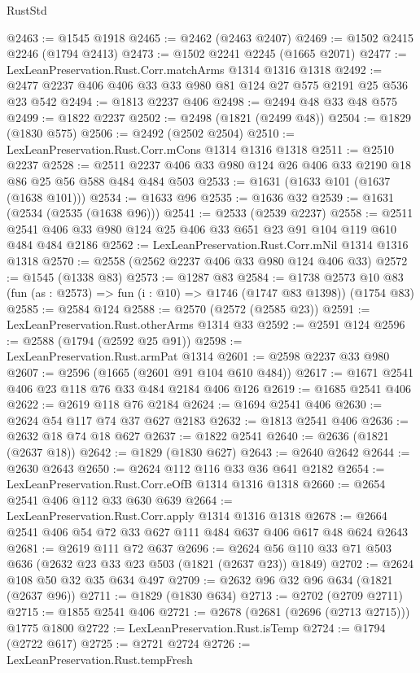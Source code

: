 \begin{lexlean}{RustStd}
\begin{coremodule}
{\begin{coremodule}
{{{{{{{{{{{{{{@2463 := @1545 @1918
@2465 := @2462 (@2463 @2407)
@2469 := @1502 @2415 @2246 (@1794 @2413)
@2473 := @1502 @2241 @2245 (@1665 @2071)
@2477 := LexLeanPreservation.Rust.Corr.matchArms @1314 @1316 @1318
@2492 := @2477 @2237 @406 @406 @33 @33 @980 @81 @124 @27 @575 @2191 @25 @536 @23 @542
@2494 := @1813 @2237 @406
@2498 := @2494 @48 @33 @48 @575
@2499 := @1822 @2237
@2502 := @2498 (@1821 (@2499 @48))
@2504 := @1829 (@1830 @575)
@2506 := @2492 (@2502 @2504)
@2510 := LexLeanPreservation.Rust.Corr.mCons @1314 @1316 @1318
@2511 := @2510 @2237
@2528 := @2511 @2237 @406 @33 @980 @124 @26 @406 @33 @2190 @18 @86 @25 @56 @588 @484 @484 @503
@2533 := @1631 (@1633 @101 (@1637 (@1638 @101)))
@2534 := @1633 @96
@2535 := @1636 @32
@2539 := @1631 (@2534 (@2535 (@1638 @96)))
@2541 := @2533 (@2539 @2237)
@2558 := @2511 @2541 @406 @33 @980 @124 @25 @406 @33 @651 @23 @91 @104 @119 @610 @484 @484 @2186
@2562 := LexLeanPreservation.Rust.Corr.mNil @1314 @1316 @1318
@2570 := @2558 (@2562 @2237 @406 @33 @980 @124 @406 @33)
@2572 := @1545 (@1338 @83)
@2573 := @1287 @83
@2584 := @1738
    @2573
    @10
    @83
    (fun (as : @2573) => fun (i : @10) => @1746 (@1747 @83 @1398))
    (@1754 @83)
@2585 := @2584 @124
@2588 := @2570 (@2572 (@2585 @23))
@2591 := LexLeanPreservation.Rust.otherArms @1314 @33
@2592 := @2591 @124
@2596 := @2588 (@1794 (@2592 @25 @91))
@2598 := LexLeanPreservation.Rust.armPat @1314
@2601 := @2598 @2237 @33 @980
@2607 := @2596 (@1665 (@2601 @91 @104 @610 @484))
@2617 := @1671 @2541 @406 @23 @118 @76 @33 @484 @2184 @406 @126
@2619 := @1685 @2541 @406
@2622 := @2619 @118 @76 @2184
@2624 := @1694 @2541 @406
@2630 := @2624 @54 @117 @74 @37 @627 @2183
@2632 := @1813 @2541 @406
@2636 := @2632 @18 @74 @18 @627
@2637 := @1822 @2541
@2640 := @2636 (@1821 (@2637 @18))
@2642 := @1829 (@1830 @627)
@2643 := @2640 @2642
@2644 := @2630 @2643
@2650 := @2624 @112 @116 @33 @36 @641 @2182
@2654 := LexLeanPreservation.Rust.Corr.eOfB @1314 @1316 @1318
@2660 := @2654 @2541 @406 @112 @33 @630 @639
@2664 := LexLeanPreservation.Rust.Corr.apply @1314 @1316 @1318
@2678 := @2664 @2541 @406 @54 @72 @33 @627 @111 @484 @637 @406 @617 @48 @624 @2643
@2681 := @2619 @111 @72 @637
@2696 := @2624 @56 @110 @33 @71 @503 @636 (@2632 @23 @33 @23 @503 (@1821 (@2637 @23)) @1849)
@2702 := @2624 @108 @50 @32 @35 @634 @497
@2709 := @2632 @96 @32 @96 @634 (@1821 (@2637 @96))
@2711 := @1829 (@1830 @634)
@2713 := @2702 (@2709 @2711)
@2715 := @1855 @2541 @406
@2721 := @2678 (@2681 (@2696 (@2713 @2715))) @1775 @1800
@2722 := LexLeanPreservation.Rust.isTemp
@2724 := @1794 (@2722 @617)
@2725 := @2721 @2724
@2726 := LexLeanPreservation.Rust.tempFresh
}}}}}}}}}}}}}}
\end{coremodule}}
\end{coremodule}
\end{lexlean}
